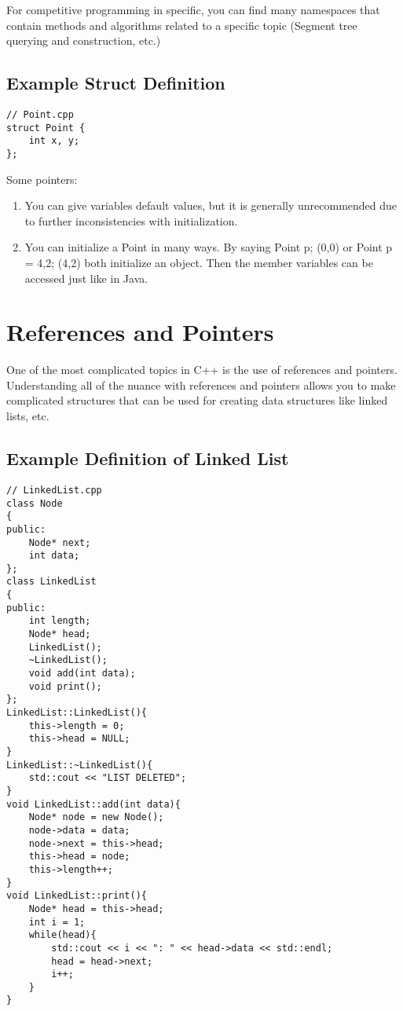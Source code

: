 \documentclass{article}
\begin{document}
For competitive programming in specific, you can find many namespaces that contain methods and algorithms related to a specific topic (Segment tree querying and construction, etc.)

\subsection{Example Struct Definition}
\begin{lstlisting}
// Point.cpp
struct Point {
    int x, y;
};
\end{lstlisting}
Some pointers:
\begin{enumerate}
    \item You can give variables default values, but it is generally unrecommended due to further inconsistencies with initialization.
    \item You can initialize a Point in many ways. By saying Point p; (0,0) or Point p = {4,2}; (4,2) both initialize an object. Then the member variables can be accessed just like in Java. 
\end{enumerate}
\section{References and Pointers}
One of the most complicated topics in C++ is the use of references and pointers. Understanding all of the nuance with references and pointers allows you to make complicated structures that can be used for creating data structures like linked lists, etc.

\subsection{Example Definition of Linked List}
\begin{lstlisting}
// LinkedList.cpp
class Node
{
public:
    Node* next;
    int data;
};
class LinkedList
{
public:
    int length;
    Node* head;
    LinkedList();
    ~LinkedList();
    void add(int data);
    void print();
};
LinkedList::LinkedList(){
    this->length = 0;
    this->head = NULL;
}
LinkedList::~LinkedList(){
    std::cout << "LIST DELETED";
}
void LinkedList::add(int data){
    Node* node = new Node();
    node->data = data;
    node->next = this->head;
    this->head = node;
    this->length++;
}
void LinkedList::print(){
    Node* head = this->head;
    int i = 1;
    while(head){
        std::cout << i << ": " << head->data << std::endl;
        head = head->next;
        i++;
    }
}
\end{lstlisting}
\end{document}
